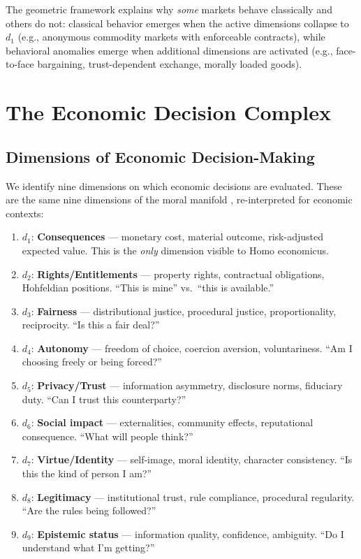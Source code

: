 \documentclass[12pt]{article}
\theoremstyle{definition}
\theoremstyle{remark}
\begin{document}
The geometric framework explains why \emph{some} markets behave classically and others do not: classical behavior emerges when the active dimensions collapse to $d_1$ (e.g., anonymous commodity markets with enforceable contracts), while behavioral anomalies emerge when additional dimensions are activated (e.g., face-to-face bargaining, trust-dependent exchange, morally loaded goods).


\section{The Economic Decision Complex}
\label{sec:manifold}

\subsection{Dimensions of Economic Decision-Making}

We identify nine dimensions on which economic decisions are evaluated.  These are the same nine dimensions of the moral manifold \cite{bond2026geometric}, re-interpreted for economic contexts:

\begin{enumerate}
    \item $d_1$: \textbf{Consequences} --- monetary cost, material outcome, risk-adjusted expected value.  This is the \emph{only} dimension visible to Homo economicus.
    \item $d_2$: \textbf{Rights/Entitlements} --- property rights, contractual obligations, Hohfeldian positions.  ``This is mine'' vs.\ ``this is available.''
    \item $d_3$: \textbf{Fairness} --- distributional justice, procedural justice, proportionality, reciprocity.  ``Is this a fair deal?''
    \item $d_4$: \textbf{Autonomy} --- freedom of choice, coercion aversion, voluntariness.  ``Am I choosing freely or being forced?''
    \item $d_5$: \textbf{Privacy/Trust} --- information asymmetry, disclosure norms, fiduciary duty.  ``Can I trust this counterparty?''
    \item $d_6$: \textbf{Social impact} --- externalities, community effects, reputational consequence.  ``What will people think?''
    \item $d_7$: \textbf{Virtue/Identity} --- self-image, moral identity, character consistency.  ``Is this the kind of person I am?''
    \item $d_8$: \textbf{Legitimacy} --- institutional trust, rule compliance, procedural regularity.  ``Are the rules being followed?''
    \item $d_9$: \textbf{Epistemic status} --- information quality, confidence, ambiguity.  ``Do I understand what I'm getting?''
\end{enumerate}
\end{document}
